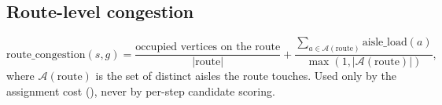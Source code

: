 \subsection{Route-level congestion}
\label{sec:congestion-route}

\begin{equation}
  \mathrm{route\_congestion}(s, g)
    = \frac{\text{occupied vertices on the route}}{|\mathrm{route}|}
    + \frac{\sum_{a \in \mathcal{A}(\mathrm{route})} \mathrm{aisle\_load}(a)}
        {\max(1, |\mathcal{A}(\mathrm{route})|)},
\end{equation}
where $\mathcal{A}(\mathrm{route})$ is the set of distinct aisles the route
touches. Used only by the assignment cost (), never by
per-step candidate scoring.

